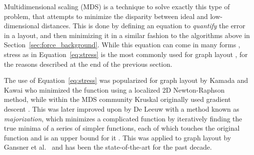 Multidimensional scaling (MDS) is a technique to solve exactly this type of problem, that attempts to minimize the disparity between ideal and low-dimensional distances.
This is done by defining an equation to \emph{quantify} the error in a layout, and then minimizing it in a similar fashion to the algorithms above in Section~\ref{sec:force_background}. While this equation can come in many forms \cite{Cox2000}, stress as in Equation~\eqref{eq:stress} is the most commonly used for graph layout \cite{Brandes2008}, for the reasons described at the end of the previous section.

The use of Equation~\eqref{eq:stress} was popularized for graph layout by Kamada and Kawai \cite{Kamada1989} who minimized the function using a localized 2D Newton-Raphson method, while within the MDS community Kruskal \cite{Kruskal1964Optimizing} originally used gradient descent \cite{Kruskal1964Numerical}. This was later improved upon by De Leeuw \cite{DeLeeuw1988} with a method known as \emph{majorization},
which minimizes a complicated function by iteratively finding the 
true minima of a series of simpler functions, each of which touches the 
original function and is an upper bound for it \cite{Cox2000}.
This was applied to graph layout by Gansner et al.\ \cite{Gansner2004} and has been the state-of-the-art for the past decade.

